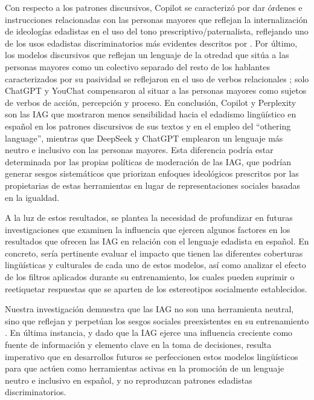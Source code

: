 \documentclass[spanish]{textolivre}
\begin{document}
Con respecto a los patrones discursivos, Copilot se caracterizó por dar órdenes e instrucciones relacionadas con las personas mayores que reflejan la internalización de ideologías edadistas en el uso del tono prescriptivo/paternalista, reflejando uno de los usos edadistas discriminatorios más evidentes descritos por \textcite{celdran2023, morenofernandez2025}. Por último, los modelos discursivos que reflejan un lenguaje de la otredad que sitúa a las personas mayores como un colectivo separado del resto de los hablantes caracterizados por su pasividad se reflejaron en el uso de verbos relacionales \cite{stypinska2023, vanleeuwen2024}; solo ChatGPT y YouChat compensaron al situar a las personas mayores como sujetos de verbos de acción, percepción y proceso. En conclusión, Copilot y Perplexity son las IAG que mostraron menos sensibilidad hacia el edadismo lingüístico en español en los patrones discursivos de sus textos y en el empleo del ``othering language'', mientras que DeepSeek y ChatGPT emplearon un lenguaje más neutro e inclusivo con las personas mayores. Esta diferencia podría estar determinada por las propias políticas de moderación de las IAG, que podrían generar sesgos sistemáticos que priorizan enfoques ideológicos prescritos por las propietarias de estas herramientas en lugar de representaciones sociales basadas en la igualdad.

A la luz de estos resultados, se plantea la necesidad de profundizar en futuras investigaciones que examinen la influencia que ejercen algunos factores en los resultados que ofrecen las IAG en relación con el lenguaje edadista en español. En concreto, sería pertinente evaluar el impacto que tienen las diferentes coberturas lingüísticas y culturales de cada uno de estos modelos, así como analizar el efecto de los filtros aplicados durante su entrenamiento, los cuales pueden suprimir o reetiquetar respuestas que se aparten de los estereotipos socialmente establecidos.

Nuestra investigación demuestra que las IAG no son una herramienta neutral, sino que reflejan y perpetúan los sesgos sociales preexistentes en su entrenamiento \cite{carneiro2022, buolamwini2018, lippens2024, urbina2025, stypinska2023}. En última instancia, y dado que la IAG ejerce una influencia creciente como fuente de información y elemento clave en la toma de decisiones, resulta imperativo que en desarrollos futuros se perfeccionen estos modelos lingüísticos para que actúen como herramientas activas en la promoción de un lenguaje neutro e inclusivo en español, y no reproduzcan patrones edadistas discriminatorios.
\end{document}
